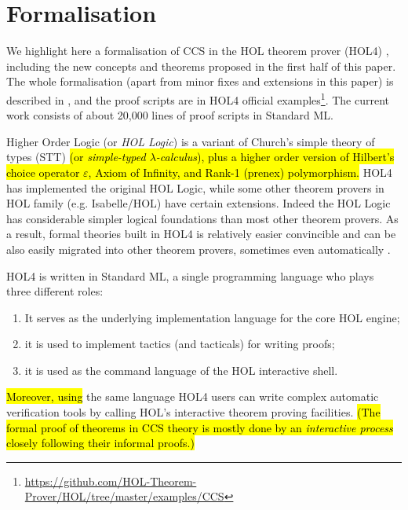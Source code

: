 \section{Formalisation}
\label{s:for}
We highlight here a formalisation of CCS
in the HOL theorem
prover (HOL4) \cite{slind2008brief},
including the new concepts and theorems proposed in the first half of
this paper.
The whole formalisation (apart from minor fixes and extensions in this
paper)
is described in \cite{Tian:2017wrba}, and the
proof scripts are in HOL4 official
examples\footnote{\url{https://github.com/HOL-Theorem-Prover/HOL/tree/master/examples/CCS}}. The
current work consists of about 20,000 lines of proof scripts in Standard ML.

Higher Order Logic (or \emph{HOL Logic}) \cite{hollogic} is a variant of
Church’s simple theory of types (STT) \cite{church1940formulation}
\hl{(or \emph{simple-typed $\lambda$-calculus}),
plus a higher order version of Hilbert's choice operator $\varepsilon$,
Axiom of Infinity, and Rank-1 (prenex) polymorphism.}
HOL4 has implemented the original HOL Logic, 
while some other theorem provers in HOL family (e.g. Isabelle/HOL) have
certain extensions.
Indeed the HOL Logic has considerable simpler logical
foundations than most other theorem provers. %
As a result,
formal theories built in HOL4 is relatively easier convincible and can
be also easily migrated into other theorem provers,
sometimes even automatically \cite{hurd2011opentheory}.

HOL4 is written in Standard ML, a single programming language who
plays three different roles:
\begin{enumerate}
\item It serves as the underlying implementation language for the core HOL engine;
\item it is used to implement tactics (and tacticals) for writing proofs;
\item it is used as the command language of the HOL interactive shell.
\end{enumerate}
\hl{Moreover, using} the same language HOL4 users can write complex automatic
verification tools by calling HOL's interactive theorem proving
facilities. \hl{(The formal proof of theorems in CCS theory
is mostly done by an \emph{interactive process} closely following
their informal proofs.)}

